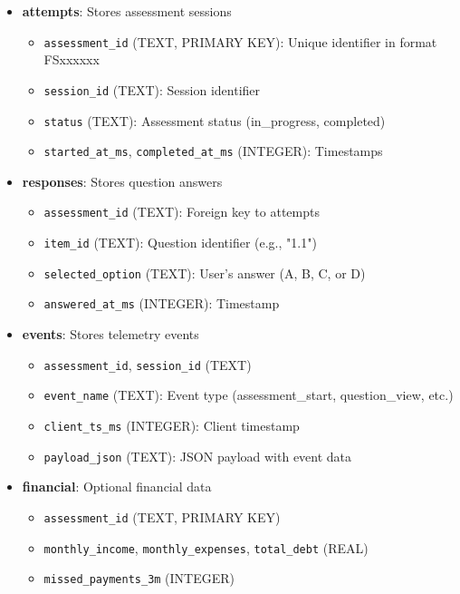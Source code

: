 \documentclass[11pt,a4paper]{article}
\begin{document}
\begin{itemize}
    \item \textbf{attempts}: Stores assessment sessions
        \begin{itemize}
            \item \texttt{assessment\_id} (TEXT, PRIMARY KEY): Unique identifier in format FSxxxxxx
            \item \texttt{session\_id} (TEXT): Session identifier
            \item \texttt{status} (TEXT): Assessment status (in\_progress, completed)
            \item \texttt{started\_at\_ms}, \texttt{completed\_at\_ms} (INTEGER): Timestamps
        \end{itemize}
    
    \item \textbf{responses}: Stores question answers
        \begin{itemize}
            \item \texttt{assessment\_id} (TEXT): Foreign key to attempts
            \item \texttt{item\_id} (TEXT): Question identifier (e.g., "1.1")
            \item \texttt{selected\_option} (TEXT): User's answer (A, B, C, or D)
            \item \texttt{answered\_at\_ms} (INTEGER): Timestamp
        \end{itemize}
    
    \item \textbf{events}: Stores telemetry events
        \begin{itemize}
            \item \texttt{assessment\_id}, \texttt{session\_id} (TEXT)
            \item \texttt{event\_name} (TEXT): Event type (assessment\_start, question\_view, etc.)
            \item \texttt{client\_ts\_ms} (INTEGER): Client timestamp
            \item \texttt{payload\_json} (TEXT): JSON payload with event data
        \end{itemize}
    
    \item \textbf{financial}: Optional financial data
        \begin{itemize}
            \item \texttt{assessment\_id} (TEXT, PRIMARY KEY)
            \item \texttt{monthly\_income}, \texttt{monthly\_expenses}, \texttt{total\_debt} (REAL)
            \item \texttt{missed\_payments\_3m} (INTEGER)
        \end{itemize}
    

\end{itemize}
\end{document}
